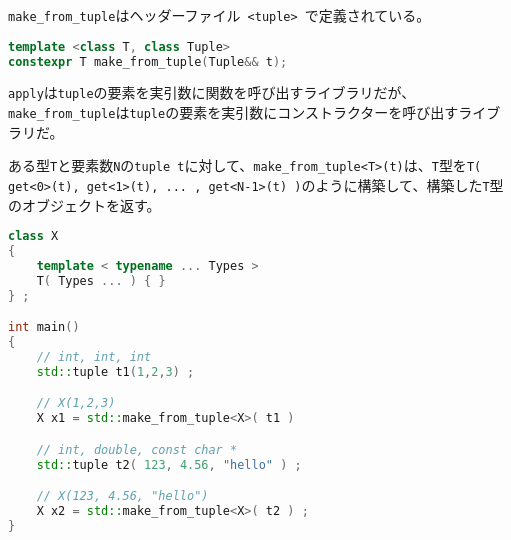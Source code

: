 %

\lstinline!make_from_tuple!はヘッダーファイル~\lstinline!<tuple>!~で定義されている。

\begin{lstlisting}[language=C++]
template <class T, class Tuple>
constexpr T make_from_tuple(Tuple&& t);
\end{lstlisting}

\lstinline!apply!は\lstinline!tuple!の要素を実引数に関数を呼び出すライブラリだが、\lstinline!make_from_tuple!は\lstinline!tuple!の要素を実引数にコンストラクターを呼び出すライブラリだ。

ある型\lstinline!T!と要素数\lstinline!N!の\lstinline!tuple t!に対して、\lstinline!make_from_tuple<T>(t)!は、\lstinline!T!型を\lstinline!T( get<0>(t), get<1>(t), ... , get<N-1>(t) )!のように構築して、構築した\lstinline!T!型のオブジェクトを返す。

\begin{lstlisting}[language=C++]
class X
{
    template < typename ... Types >
    T( Types ... ) { }
} ;

int main()
{
    // int, int, int
    std::tuple t1(1,2,3) ;

    // X(1,2,3)
    X x1 = std::make_from_tuple<X>( t1 ) 

    // int, double, const char *
    std::tuple t2( 123, 4.56, "hello" ) ;

    // X(123, 4.56, "hello")
    X x2 = std::make_from_tuple<X>( t2 ) ;
}
\end{lstlisting}

